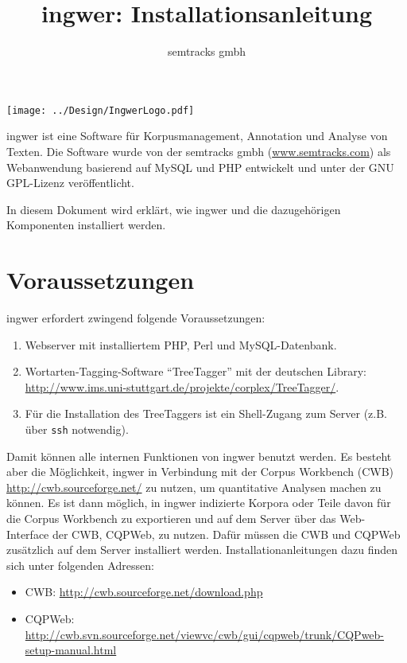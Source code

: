 \documentclass[11pt]{scrartcl} %
\title{ingwer: Installationsanleitung}
\author{semtracks gmbh}
\begin{document}
\texttt{[image: ../Design/IngwerLogo.pdf]}

\maketitle


\noindent ingwer ist eine Software f\"ur Korpusmanagement, Annotation und Analyse von Texten. Die Software wurde von der semtracks gmbh (\url{www.semtracks.com}) als Webanwendung basierend auf MySQL und PHP entwickelt und unter der GNU GPL-Lizenz ver\"offentlicht. 

In diesem Dokument wird erkl\"art, wie ingwer und die dazugeh\"origen Komponenten installiert werden.

\section{Voraussetzungen}

ingwer erfordert zwingend folgende Voraussetzungen:

\begin{enumerate}
\item Webserver mit installiertem PHP, Perl und MySQL-Datenbank.
\item Wortarten-Tagging-Software \enquote{TreeTagger} mit der deutschen Library: \url{http://www.ims.uni-stuttgart.de/projekte/corplex/TreeTagger/}.
\item F\"ur die Installation des TreeTaggers ist ein Shell-Zugang zum Server (z.B. \"uber \texttt{ssh} notwendig).
\end{enumerate}

Damit k\"onnen alle internen Funktionen von ingwer benutzt werden. Es besteht aber die M\"oglichkeit, ingwer in Verbindung mit der Corpus Workbench (CWB) \url{http://cwb.sourceforge.net/} zu nutzen, um quantitative Analysen machen zu k\"onnen. Es ist dann m\"oglich, in ingwer indizierte Korpora oder Teile davon f\"ur die Corpus Workbench zu exportieren und auf dem Server \"uber das Web-Interface der CWB, CQPWeb, zu nutzen. Daf\"ur m\"ussen die CWB und CQPWeb zus\"atzlich auf dem Server installiert werden. Installationanleitungen dazu finden sich unter folgenden Adressen:

\begin{itemize}
\item CWB: \url{http://cwb.sourceforge.net/download.php}
\item CQPWeb: \url{http://cwb.svn.sourceforge.net/viewvc/cwb/gui/cqpweb/trunk/CQPweb-setup-manual.html}
\end{itemize}
\end{document}
